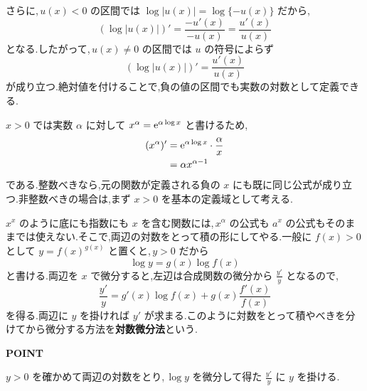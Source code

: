 さらに,\,$u(x)<0$ の区間では $\log|u(x)|=\log\{-u(x)\}$ だから,
\[
 (\log|u(x)|)'=\frac{-u'(x)}{-u(x)}=\frac{u'(x)}{u(x)}
\]
となる.したがって,\,$u(x)\ne0$ の区間では $u$ の符号によらず
\[
 (\log|u(x)|)'=\frac{u'(x)}{u(x)}
\]
が成り立つ.絶対値を付けることで,負の値の区間でも実数の対数として定義できる.

$x>0$ では実数 $\alpha$ に対して $x^\alpha=\mathrm{e}^{\alpha\log x}$ と書けるため,
\begin{align*}
 (x^\alpha)'&=\mathrm{e}^{\alpha\log x}\cdot\frac\alpha x\\
 &=\alpha x^{\alpha-1}
\end{align*}
である.整数べきなら,元の関数が定義される負の $x$ にも既に同じ公式が成り立つ.非整数べきの場合は,まず $x>0$ を基本の定義域として考える.

$x^x$ のように底にも指数にも $x$ を含む関数には,\,$x^\alpha$ の公式も $a^x$ の公式もそのままでは使えない.そこで,両辺の対数をとって積の形にしてやる.一般に $f(x)>0$ として $y=f(x)^{g(x)}$ と置くと,\,$y>0$ だから
\[
 \log y=g(x)\log f(x)
\]
と書ける.両辺を $x$ で微分すると,左辺は合成関数の微分から $\frac{y'}{y}$ となるので,
\[
 \frac{y'}{y}=g'(x)\log f(x)+g(x)\frac{f'(x)}{f(x)}
\]
を得る.両辺に $y$ を掛ければ $y'$ が求まる.このように対数をとって積やべきを分けてから微分する方法を\textbf{対数微分法}という.

\begin{bookpoint}
\textbf{POINT}\par
$y>0$ を確かめて両辺の対数をとり,\,$\log y$ を微分して得た $\frac{y'}{y}$ に $y$ を掛ける.
\end{bookpoint}

